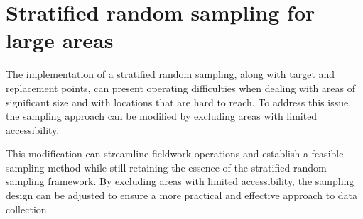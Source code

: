 \documentclass[
  10pt,
  b5paper,
  oneside]{book}
\begin{document}
\hypertarget{stratified-random-sampling-for-large-areas}{%
\section{Stratified random sampling for large areas}\label{stratified-random-sampling-for-large-areas}}

The implementation of a stratified random sampling, along with target and replacement points, can present operating difficulties when dealing with areas of significant size and with locations that are hard to reach. To address this issue, the sampling approach can be modified by excluding areas with limited accessibility.

This modification can streamline fieldwork operations and establish a feasible sampling method while still retaining the essence of the stratified random sampling framework. By excluding areas with limited accessibility, the sampling design can be adjusted to ensure a more practical and effective approach to data collection.
\end{document}
